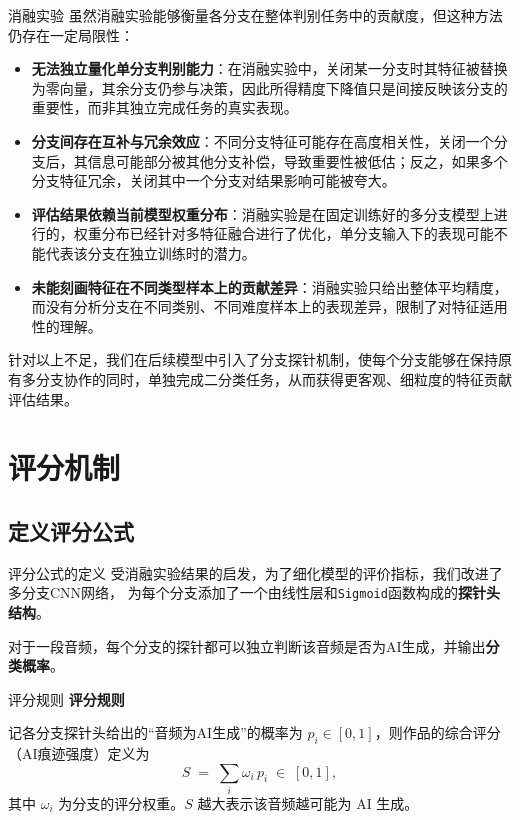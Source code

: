 \documentclass[aspectratio=169]{beamer}
\providecommand{\paragraph}[1]{\smallskip\textbf{#1}\par}
\begin{document}
\begin{frame}{消融实验}
虽然消融实验能够衡量各分支在整体判别任务中的贡献度，但这种方法仍存在一定局限性：  
\begin{itemize}
  \item \textbf{无法独立量化单分支判别能力}：在消融实验中，关闭某一分支时其特征被替换为零向量，其余分支仍参与决策，因此所得精度下降值只是间接反映该分支的重要性，而非其独立完成任务的真实表现。  
  \item \textbf{分支间存在互补与冗余效应}：不同分支特征可能存在高度相关性，关闭一个分支后，其信息可能部分被其他分支补偿，导致重要性被低估；反之，如果多个分支特征冗余，关闭其中一个分支对结果影响可能被夸大。  
  \item \textbf{评估结果依赖当前模型权重分布}：消融实验是在固定训练好的多分支模型上进行的，权重分布已经针对多特征融合进行了优化，单分支输入下的表现可能不能代表该分支在独立训练时的潜力。  
  \item \textbf{未能刻画特征在不同类型样本上的贡献差异}：消融实验只给出整体平均精度，而没有分析分支在不同类别、不同难度样本上的表现差异，限制了对特征适用性的理解。  
\end{itemize}
针对以上不足，我们在后续模型中引入了分支探针机制，使每个分支能够在保持原有多分支协作的同时，单独完成二分类任务，从而获得更客观、细粒度的特征贡献评估结果。

\end{frame}



\section{评分机制}
\subsection{定义评分公式}
\begin{frame}{评分公式的定义}
受消融实验结果的启发，为了细化模型的评价指标，我们改进了多分支CNN网络，
为每个分支添加了一个由线性层和\texttt{Sigmoid}函数构成的\textbf{探针头结构}。

对于一段音频，每个分支的探针都可以独立判断该音频是否为AI生成，并输出\textbf{分类概率}。
\end{frame}

\begin{frame}{评分规则}
\paragraph{评分规则} 记各分支探针头给出的“音频为AI生成”的概率为
$p_i\in[0,1]$，则作品的综合评分（AI痕迹强度）定义为
\begin{equation}
    S \;=\; \sum_{i} \omega_i\, p_i \;\in\;[0,1],
    \label{eq:ai_score}
\end{equation}
其中 $\omega_i$ 为分支的评分权重。$S$ 越大表示该音频越可能为 AI 生成。
\end{frame}
\end{document}
